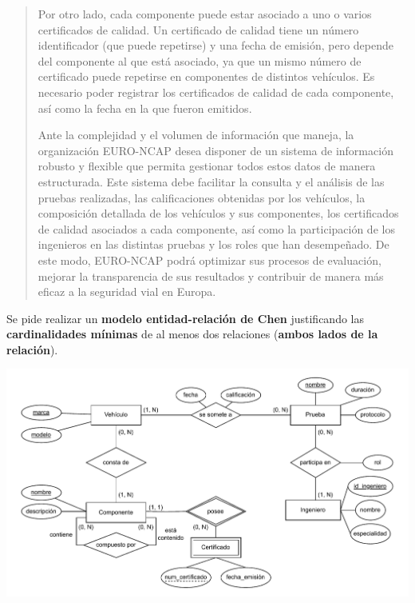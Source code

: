 \documentclass[10pt,a4paper,addpoints,answers]{exam}
\begin{document}
\begin{questions}
\begin{quotation}
Por otro lado, cada componente puede estar asociado a uno o varios certificados de calidad. Un certificado de calidad tiene un número identificador (que puede repetirse) y una fecha de emisión, pero depende del componente al que está asociado, ya que un mismo número de certificado puede repetirse en componentes de distintos vehículos. Es necesario poder registrar los certificados de calidad de cada componente, así como la fecha en la que fueron emitidos.

Ante la complejidad y el volumen de información que maneja, la organización EURO-NCAP desea disponer de un sistema de información robusto y flexible que permita gestionar todos estos datos de manera estructurada. Este sistema debe facilitar la consulta y el análisis de las pruebas realizadas, las calificaciones obtenidas por los vehículos, la composición detallada de los vehículos y sus componentes, los certificados de calidad asociados a cada componente, así como la participación de los ingenieros en las distintas pruebas y los roles que han desempeñado. De este modo, EURO-NCAP podrá optimizar sus procesos de evaluación, mejorar la transparencia de sus resultados y contribuir de manera más eficaz a la seguridad vial en Europa.
\end{quotation}

Se pide realizar un \textbf{modelo entidad-relación de Chen} justificando las  \textbf{cardinalidades mínimas} de al menos dos relaciones (\textbf{ambos lados de la relación}).

\begin{solution}[50em]
\includegraphics[width=\textwidth]{figs/bbdd-2024-2025-extraordinaria/mer25ex.pdf}


\end{solution}
\end{questions}
\end{document}

